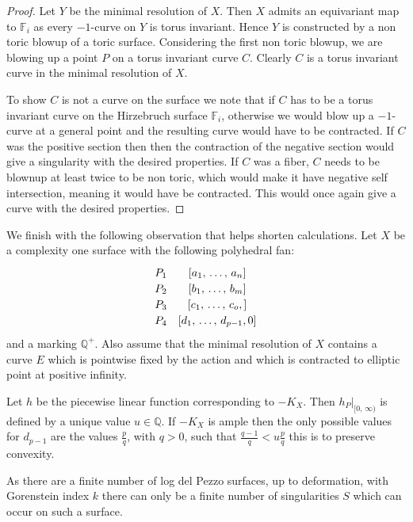 \documentclass[12pt]{amsart}
\theoremstyle{plain}
\newcommand{\mb}[1]{\mathbb{#1}}
\begin{document}
\begin{proof}
Let $Y$ be the minimal resolution of $X$. Then $X$ admits an equivariant map to $\mb{F}_i$ as every $-1$-curve on $Y$ is torus invariant. Hence $Y$ is constructed by a non toric blowup of a toric surface. Considering the first non toric blowup, we are blowing up a point $P$ on a torus invariant curve $C$. Clearly $C$ is a torus invariant curve in the minimal resolution of $X$.

To show $C$ is not a curve on the surface we note that if $C$ has to be a torus invariant curve on the Hirzebruch surface $\mb{F}_i$, otherwise we would blow up a $-1$-curve at a general point and the resulting curve would have to be contracted. If $C$ was the positive section then then the contraction of the negative section would give a singularity with the desired properties. If $C$ was a fiber, $C$ needs to be blownup at least twice to be non toric, which would make it have negative self intersection, meaning it would have be contracted. This would once again give a curve with the desired properties.
\end{proof}



We finish with the following observation that helps shorten calculations.
Let $X$ be a complexity one surface with the following polyhedral fan:
\[\def\arraystretch{1.2}
\begin{array}{cc}
P_1 & \left[ a_1, \, \dots , \, a_n \right] \\ 
P_2 & \left[b_1 , \, \dots, \, b_m \right] \\
P_3 & \left[c_1, \, \dots, \, c_o, \right] \\
P_4 & \left[d_1, \, \dots, \, d_{p-1}, 0\right]  \\
\end{array}
\]
and a marking $\mb{Q}^+$.
Also assume that the minimal resolution of $X$ contains a curve $E$ which is pointwise fixed by the action and which is contracted to elliptic point at positive infinity.

Let $h$ be the piecewise linear function corresponding to $-K_X$. Then $h_P|_{[0, \, \infty)}$ is defined by a unique value $u \in \mb{Q}$. If $-K_X$ is ample then the only possible values for $d_{p-1}$ are the values $\frac{p}{q}$, with $q >0$, such that $\frac{q-1}{q} < u\frac{p}{q}$ this is to preserve convexity. 


As there are a finite number of log del Pezzo surfaces, up to deformation, with Gorenstein index $k$ there can only be a finite number of singularities $S$ which can occur on such a surface. 
\end{document}
